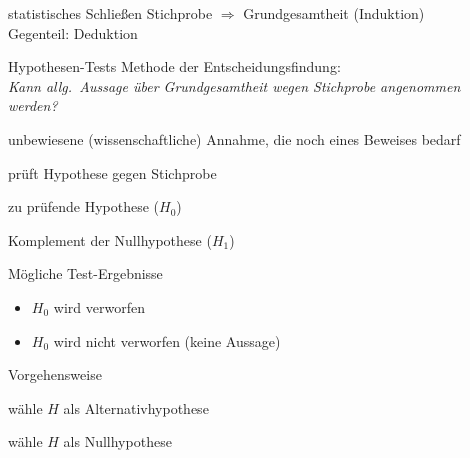 \documentclass{beamer}
\begin{document}
\begin{frame}{\insertsection}
\begin{block}{statistisches Schließen}
	Stichprobe $\Rightarrow$ Grundgesamtheit (Induktion)
	\\
	Gegenteil: Deduktion
\end{block}
\begin{block}{Hypothesen-Tests}
	Methode der Entscheidungsfindung:\\
	\emph{Kann allg.~Aussage über Grundgesamtheit wegen Stichprobe angenommen werden?}
\end{block}
\begin{definition}
	unbewiesene (wissenschaftliche) Annahme, die noch eines Beweises bedarf
\end{definition}
\end{frame}

\begin{frame}{\insertsection}
\begin{definition}
	\begin{description}[Alternativhypothese]
	\item[Statistischer Test] prüft Hypothese gegen Stichprobe
	\item[Nullhypothese] zu prüfende Hypothese ($H_0$)
	\item[Alternativhypothese] Komplement der Nullhypothese ($H_1$)
	\end{description}
\end{definition}
\begin{block}{Mögliche Test-Ergebnisse}
	\begin{itemize}
	\item $H_0$ wird verworfen
	\item $H_0$ wird nicht verworfen (keine Aussage)
	\end{itemize}
\end{block}
\begin{block}{Vorgehensweise}
	\begin{description}[$H$ widerlegen]
	\item[$H$ beweisen] wähle $H$ als Alternativhypothese
	\item[$H$ widerlegen] wähle $H$ als Nullhypothese
	\end{description}
\end{block}
\end{frame}
\end{document}
